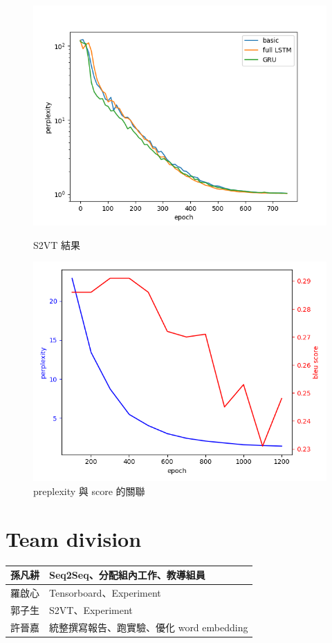 \documentclass[12pt, a4paper]{article}
\theoremstyle{mystyle}	%
\begin{document}
  \begin{figure}[!htb]
    \centering
    \includegraphics[scale=0.5]{jason.png}
    \caption{S2VT 結果}
    \label{fig:jason}
   \endminipage \hfill
    \includegraphics[scale=0.5]{score.png}
    \caption{preplexity 與 score 的關聯}
    \label{fig:score}
   \endminipage
  \end{figure}

\section{Team division}
\begin{table}[h]
\centering
\begin{tabular}{ |C{2cm}|C{10cm}| }
  \hline
  孫凡耕 & Seq2Seq、分配組內工作、教導組員\\
  \hline
  羅啟心 & Tensorboard、Experiment\\
  \hline
  郭子生 & S2VT、Experiment\\
  \hline
  許晉嘉 & 統整撰寫報告、跑實驗、優化 word embedding\\
  \hline
\end{tabular}
\end{table}
\end{document}

